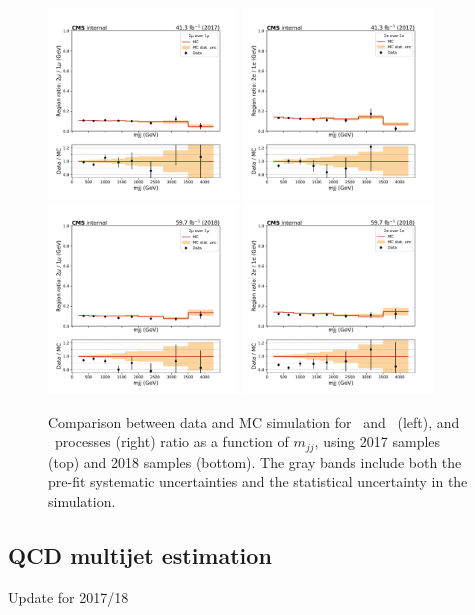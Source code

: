 \begin{figure}[htbp]
  \centering
  \includegraphics[width=0.45\textwidth]{fig/datamc/ratios/ratio_losf_mjj_cr_2m_vbf_over_cr_1m_vbf_2017.pdf}
  \includegraphics[width=0.45\textwidth]{fig/datamc/ratios/ratio_losf_mjj_cr_2e_vbf_over_cr_1e_vbf_2017.pdf} \\
  \includegraphics[width=0.45\textwidth]{fig/datamc/ratios/ratio_losf_mjj_cr_2m_vbf_over_cr_1m_vbf_2018.pdf}
  \includegraphics[width=0.45\textwidth]{fig/datamc/ratios/ratio_losf_mjj_cr_2e_vbf_over_cr_1e_vbf_2018.pdf}
  \caption{Comparison between data and MC simulation for
     \Zmmjets~and \Wmnjets~(left), \Zeejets and \Wenjets~processes (right) ratio as a function of $m_{jj}$, using 2017 samples (top)
     and 2018 samples (bottom).      
     The gray bands include both the pre-fit systematic uncertainties and the statistical uncertainty in the simulation.}
  \label{fig:Ratio}
\end{figure}


\subsection{QCD multijet estimation}
{\color{red} Update for 2017/18}

